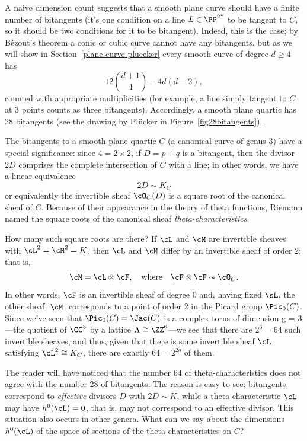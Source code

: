 A naive dimension count suggests that a smooth plane curve should have a finite number of bitangents (it's one condition on a line $L \in {\PP^2}^*$ to be tangent to $C$, so it should be two conditions for it to be bitangent). Indeed, this is the case; by B\'ezout's theorem a conic or cubic curve cannot have any bitangents, but as we will show in Section~\ref{plane curve pluecker} every smooth curve of degree $d \geq 4$ has 
$$
12\binom{d+1}{4} - 4d(d-2),
$$
counted with appropriate multiplicities (for example, a line simply tangent to $C$ at 3 points  counts as three bitangents). Accordingly, a smooth plane quartic has 28 bitangents (see the drawing by Pl\"ucker in Figure~\ref{fig28bitangents}).

The bitangents to a smooth plane quartic $C$ (a canonical curve of genus 3) have a special significance: since $4 = 2 \times 2$, if $D = p+q$ is a bitangent, then the divisor $2D$ comprises the complete intersection of $C$ with a line; in other words, we have a linear equivalence
$$
2D \sim K_C
$$
or equivalently the invertible sheaf $\cO_C(D)$ is a square root of the canonical sheaf of $C$. Because of their appearance in the theory of theta functions, Riemann named the square roots of the canonical sheaf \emph{theta-characteristics}.

How many such square roots are there? If $\cL$ and $\cM$ are invertible sheaves with $\cL^2 = \cM^2 = K$, then $\cL$ and $\cM$ differ by an invertible sheaf of order 2; that is,
$$
\cM = \cL \otimes \cF, \quad \text{where} \quad \cF \otimes \cF \sim \cO_C.
$$
In other words, $\cF$ is an invertible sheaf of degree 0 and, having fixed $\sL$,  the other sheaf, $\cM$, corresponds to a point of order 2 in the Picard group $\Pic_0(C)$. Since we've seen that $\Pic_0(C) = \Jac(C)$ is a complex torus of dimension g = 3---the quotient of $\CC^3$ by a lattice $\Lambda \cong \ZZ^6$---we see that there are $2^6 = 64$ such invertible sheaves, and thus, given that there is some invertible sheaf $\cL$ satisfying $\cL^2 \cong K_C$, there are exactly $64 = 2^{2g}$ of them.

  
The reader will have noticed that the number 64 of theta-characteristics does not agree with the number 28 of bitangents. The reason is easy to see: bitangents correspond to \emph{effective} divisors $D$ with $2D \sim K$, while a theta characteristic $\cL$ may have $h^0(\cL) = 0$, that is, may not correspond to an effective divisor. 
This situation also occurs in other genera. 
What can we say about the dimensions $h^0(\cL)$ of the space of sections of the theta-characteristics on $C$?
 
